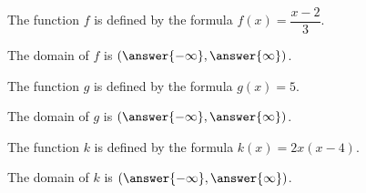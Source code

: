 \documentclass{ximera}
\author{Carl Stitz \and Jeff Zeager \and Bart Snapp \and Matthew Carr \and Bobby Ramsey}
\begin{document}
\licenseSZ
\begin{exercise} 
	The function $f$ is defined by the formula $f(x)=\dfrac{x - 2}{3}$.
	\begin{center}
		The domain of $f$ is $(\answer{-\infty},\answer{\infty})$.
	\end{center}
\end{exercise}

\begin{exercise} 
	The function $g$ is defined by the formula $g(x)=5$.
	\begin{center}
		The domain of $g$ is $(\answer{-\infty},\answer{\infty})$.
	\end{center}
\end{exercise}

\begin{exercise} 
	The function $k$ is defined by the formula $k(x)=2x(x-4)$.
	\begin{center}
		The domain of $k$ is $(\answer{-\infty},\answer{\infty})$.
	\end{center}
\end{exercise}
\end{document}

